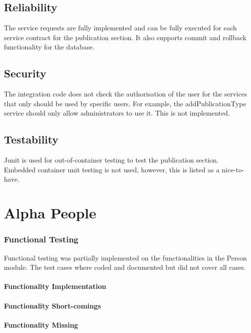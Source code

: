 \documentclass{article}
\begin{document}
    
    \subsection{Reliability}
    The service requests are fully implemented and can be fully executed for each service contract for the publication section. It also supports commit and rollback functionality for the database.
    
    \subsection{Security}
    The integration code does not check the authorisation of the user for the services that only should be used by specific users. For example, the addPublicationType service should only allow administrators to use it. This is not implemented.
    
    \subsection{Testability}
    Junit is used for out-of-container testing to test the publication section. Embedded container unit testing is not used, however, this is listed as a nice-to-have.

\newpage
\section{Alpha People}
\subsubsection{Functional Testing}
    Functional testing was partially implemented on the functionalities in the Person module. The test cases where coded and documented but did not cover all cases.
\paragraph{Functionality Implementation}
\paragraph{Functionality Short-comings}
\paragraph{Functionality Missing}
\end{document}
